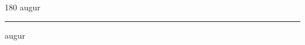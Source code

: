 
\begin{frame}
\begin{center}
\begin{turn}{180}
{\fontsize{2.5cm}{1em}\selectfont augur}
\end{turn}
\vspace{1em}\par  
\hrule
\vspace{1em}\par  
{\fontsize{2.5cm}{1em}\selectfont augur}
\end{center}
\end{frame}
